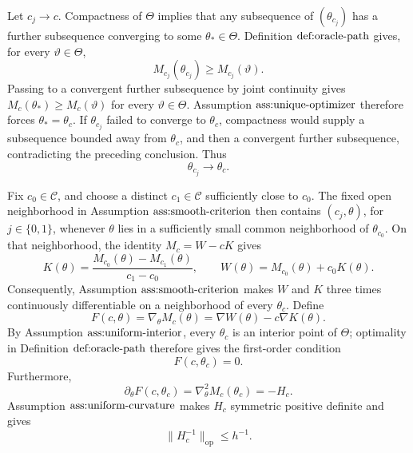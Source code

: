Let \(c_j\to c\).  Compactness of \(\Theta\) implies that any subsequence of \((\theta_{c_j})\) has a further subsequence converging to some \(\theta_*\in\Theta\).  Definition \(\textnormal{def:oracle-path}\) gives, for every \(\vartheta\in\Theta\),
\[
 M_{c_j}(\theta_{c_j})\geq M_{c_j}(\vartheta).
\]
Passing to a convergent further subsequence by joint continuity gives \(M_c(\theta_*)\geq M_c(\vartheta)\) for every \(\vartheta\in\Theta\).  Assumption \(\textnormal{ass:unique-optimizer}\) therefore forces \(\theta_*=\theta_c\).  If \(\theta_{c_j}\) failed to converge to \(\theta_c\), compactness would supply a subsequence bounded away from \(\theta_c\), and then a convergent further subsequence, contradicting the preceding conclusion.  Thus
\[
 \theta_{c_j}\longrightarrow\theta_c.                         \tag{4}
\]

Fix \(c_0\in\mathcal C\), and choose a distinct \(c_1\in\mathcal C\) sufficiently close to \(c_0\).  The fixed open neighborhood in Assumption \(\textnormal{ass:smooth-criterion}\) then contains \((c_j,\theta)\), for \(j\in\{0,1\}\), whenever \(\theta\) lies in a sufficiently small common neighborhood of \(\theta_{c_0}\).  On that neighborhood, the identity \(M_c=W-cK\) gives
\[
 K(\theta)=\frac{M_{c_0}(\theta)-M_{c_1}(\theta)}{c_1-c_0},
 \qquad
 W(\theta)=M_{c_0}(\theta)+c_0K(\theta).                       \tag{5}
\]
Consequently, Assumption \(\textnormal{ass:smooth-criterion}\) makes \(W\) and \(K\) three times continuously differentiable on a neighborhood of every \(\theta_c\).  Define
\[
 F(c,\theta)=\nabla_\theta M_c(\theta)
             =\nabla W(\theta)-c\nabla K(\theta).
\]
By Assumption \(\textnormal{ass:uniform-interior}\), every \(\theta_c\) is an interior point of \(\Theta\); optimality in Definition \(\textnormal{def:oracle-path}\) therefore gives the first-order condition
\[
 F(c,\theta_c)=0.                                               \tag{6}
\]
Furthermore,
\[
 \partial_\theta F(c,\theta_c)
 =\nabla_\theta^2M_c(\theta_c)=-H_c.                              \tag{7}
\]
Assumption \(\textnormal{ass:uniform-curvature}\) makes \(H_c\) symmetric positive definite and gives
\[
 \|H_c^{-1}\|_{\mathrm{op}}\leq h^{-1}.                       \tag{8}
\]

